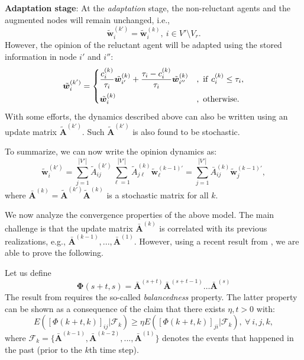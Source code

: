 \documentclass[letter]{article}
\theoremstyle{remark}
\begin{document}
\textbf{Adaptation stage}: At the \emph{adaptation} stage, the non-reluctant agents and the augmented nodes will remain unchanged, i.e.,
\[
\tilde{\bm w}_i^{(k')} = \tilde{\bm w}_i^{(k)},~i \in V' \setminus V_r.
\]
However, the opinion of the reluctant agent will be adapted using the stored information in node $i'$ and $i''$:
\[
\tilde{\bm w}_i^{(k')} = \begin{cases}
\displaystyle \frac{c_i^{(k)}}{\tau_i} \tilde{\bm w}_{i'}^{(k)} + \frac{\tau_i - c_i^{(k)}}{\tau_i} \tilde{\bm w}_{i''}^{(k)} &,~{\rm if}~c_i^{(k)} \leq \tau_i, \vspace{.2cm} \\
\tilde{\bm w}_i^{(k)} &,~{\rm otherwise}.
\end{cases}
\]
With some efforts, the dynamics described above can also be written using an update matrix $\tilde{\bm A}^{(k')}$. Such $\tilde{\bm A}^{(k')}$ is also found to be stochastic.

To summarize, we can now write the opinion dynamics as:
\[
\tilde{\bm w}_i^{(k')} = \sum_{j=1}^{|V'|} \tilde{A}_{ij}^{(k')} \sum_{\ell=1}^{|V'|} \tilde{A}_{j \ell}^{(k)} \tilde{\bm w}_{\ell}^{(k-1)'} =  \sum_{j=1}^{|V'|} \bar{A}_{ij}^{(k)} \tilde{\bm w}_{j}^{(k-1)'},
\]
where $\bar{\bm A}^{(k)} = \tilde{\bm A}^{(k')}  \tilde{\bm A}^{(k)}$ is a stochastic matrix for all $k$. 

We now analyze the convergence properties of the above model.
The main challenge is that the update matrix $\bar{\bm A}^{(k)}$ is correlated with its previous realizations, e.g., $\bar{\bm A}^{(k-1)}, ..., \bar{\bm A}^{(1)}$. 
However, using a recent result from \cite{Touri2014}, we are able to prove the following. 

Let us define 
\[
\bm{\Phi} (s+t,s) = \bar{\bm A}^{(s+t)}  \bar{\bm A}^{(s+t-1)} \ldots  \bar{\bm A}^{(s)}
\]
The result from \cite{Touri2014} requires the so-called \emph{balancedness} property. The latter property can be shown as a consequence of the claim that there exists $\eta, t > 0$ with:
\begin{equation} \label{eq:claim}
E \left( [\Phi (k+t,k)]_{ij} | \mathcal{F}_{k} \right) \geq \eta E \left( [\Phi (k+t,k)]_{ji} | \mathcal{F}_{k} \right),~\forall~i,j,k,
\end{equation}
where $ \mathcal{F}_{k}  = \{  \bar{\bm A}^{(k-1)},  \bar{\bm A}^{(k-2)}, ...,  \bar{\bm A}^{(1)} \}$ denotes the events that happened in the past (prior to the $k$th time step). 
\end{document}
